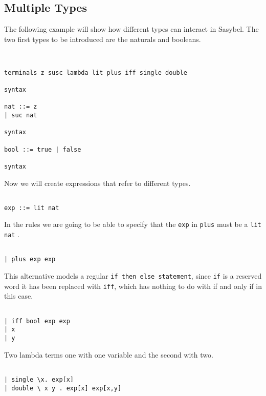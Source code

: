 \documentclass[12pt]{article}
\begin{document}
\subsection{Multiple Types}
The following example will show how different types can interact in \textmd{Sasybel}. The two first types to be introduced are the naturals and booleans.
\begin{verbatim}


terminals z susc lambda lit plus iff single double

syntax

nat ::= z
| suc nat

syntax

bool ::= true | false

syntax

\end{verbatim}
Now we will create expressions that refer to different types.
\begin{verbatim}

exp ::= lit nat

\end{verbatim}
In the rules we are going to be able to specify that the {\tt exp} in {\tt plus} must be a {\tt lit nat} .
\begin{verbatim}

| plus exp exp

\end{verbatim}
This alternative models a regular {\tt if  then  else statement}, since {\tt if} is a reserved word it has been replaced with {\tt iff}, which has nothing to do with if and only if in this case.
\begin{verbatim}

| iff bool exp exp
| x
| y

\end{verbatim}
Two lambda terms one with one variable and the second with two.
\begin{verbatim}

| single \x. exp[x]
| double \ x y . exp[x] exp[x,y]

\end{verbatim}
\end{document}

